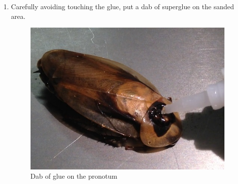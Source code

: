 \begin{enumerate}
\item Carefully avoiding touching the glue, put a dab of superglue on the sanded area.
\begin{figure}[ht!]
\centering
\includegraphics[scale=0.25]{Surgery Photos/gluepronotum.jpg}
\caption{Dab of glue on the pronotum}
\label{fig:gluepronotum}
\end{figure}
    

\end{enumerate}
